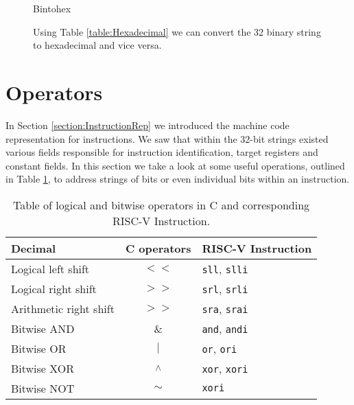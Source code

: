             \begin{figure}[h!]
                \centering
                {Bintohex}
                \caption{Using Table \ref{table:Hexadecimal} we can convert the 32 binary string to hexadecimal and vice versa.}
                \label{fig:bintohex}
            \end{figure}
       
\section{Operators}
    In Section \ref{section:InstructionRep} we introduced the machine code representation for instructions. We saw that within the 32-bit strings existed various fields responsible for instruction identification, target registers and constant fields.
    In this section we take a look at some useful operations, outlined in Table \ref{table:operators}, to address strings of bits or even individual bits within an instruction.
    
    \begin{table}[h!]
        \centering
        \begin{tabular}{|l|c|l|}
        	\hline
        	Decimal                & C operators                & RISC-V Instruction          \\ \hline
        	Logical left shift     & $<<$                      & \texttt{sll}, \texttt{slli} \\ \hline
        	Logical right shift    & $>>$                      & \texttt{srl}, \texttt{srli} \\ \hline
        	Arithmetic right shift & $>>$                      & \texttt{sra}, \texttt{srai} \\ \hline
        	Bitwise AND            & \&                         & \texttt{and}, \texttt{andi} \\ \hline
        	Bitwise OR             & $\mid$                     & \texttt{or}, \texttt{ori}   \\ \hline
        	Bitwise XOR            & \textsuperscript{$\wedge$} & \texttt{xor}, \texttt{xori} \\ \hline
        	Bitwise NOT            & $\sim$                     & \texttt{xori}               \\ \hline
        \end{tabular}
        \caption{Table of logical and bitwise operators in C and corresponding RISC-V Instruction.}
        \label{table:operators}
    \end{table}
    
